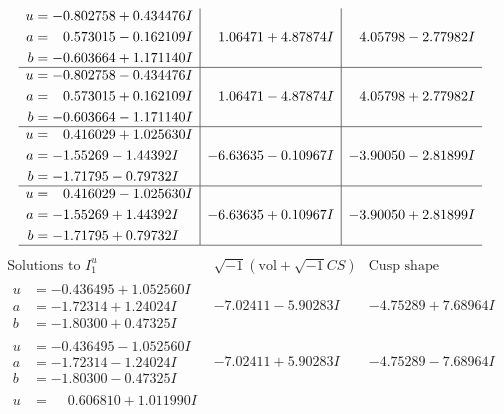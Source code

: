 \documentclass[1p]{elsarticle_modified}
\theoremstyle{definition}
\newcommand{\I}{\sqrt{-1}}
\begin{document}
$$\begin{array}{c|c|c}
\begin{aligned}
u &= -0.802758 + 0.434476 I \\
a &= \phantom{-}0.573015 - 0.162109 I \\
b &= -0.603664 + 1.171140 I\end{aligned}
 & \phantom{-}1.06471 + 4.87874 I & \phantom{-}4.05798 - 2.77982 I \\ \hline\begin{aligned}
u &= -0.802758 - 0.434476 I \\
a &= \phantom{-}0.573015 + 0.162109 I \\
b &= -0.603664 - 1.171140 I\end{aligned}
 & \phantom{-}1.06471 - 4.87874 I & \phantom{-}4.05798 + 2.77982 I \\ \hline\begin{aligned}
u &= \phantom{-}0.416029 + 1.025630 I \\
a &= -1.55269 - 1.44392 I \\
b &= -1.71795 - 0.79732 I\end{aligned}
 & -6.63635 - 0.10967 I & -3.90050 - 2.81899 I \\ \hline\begin{aligned}
u &= \phantom{-}0.416029 - 1.025630 I \\
a &= -1.55269 + 1.44392 I \\
b &= -1.71795 + 0.79732 I\end{aligned}
 & -6.63635 + 0.10967 I & -3.90050 + 2.81899 I\\
 \hline 
 \end{array}$$\newpage$$\begin{array}{c|c|c}  
\text{Solutions to }I^u_{1}& \I (\text{vol} + \sqrt{-1}CS) & \text{Cusp shape}\\
 \hline 
\begin{aligned}
u &= -0.436495 + 1.052560 I \\
a &= -1.72314 + 1.24024 I \\
b &= -1.80300 + 0.47325 I\end{aligned}
 & -7.02411 - 5.90283 I & -4.75289 + 7.68964 I \\ \hline\begin{aligned}
u &= -0.436495 - 1.052560 I \\
a &= -1.72314 - 1.24024 I \\
b &= -1.80300 - 0.47325 I\end{aligned}
 & -7.02411 + 5.90283 I & -4.75289 - 7.68964 I \\ \hline\begin{aligned}
u &= \phantom{-}0.606810 + 1.011990 I \\

\end{aligned}
\end{array}$$
\end{document}
